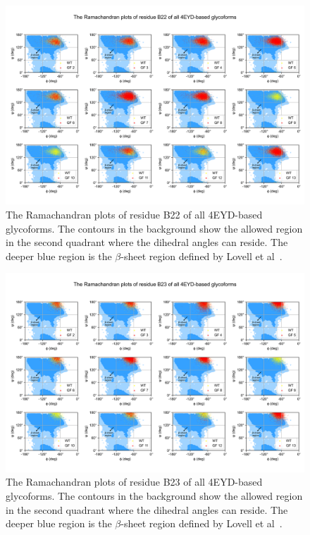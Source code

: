 \documentclass[sn-vancouver]{sn-jnl}
\begin{document}
\renewcommand{\thefigure}{S\arabic{figure}}
\begin{figure}[H]
\centering
\includegraphics[width=\textwidth]{Figures/4EYD_multi_rama_plot_res_43.png}
\caption{The Ramachandran plots of residue B22 of all 4EYD-based glycoforms. The contours in the background show the allowed region in the second quadrant where the dihedral angles can reside. The deeper blue region is the $\beta$-sheet region defined by Lovell et al~\cite{lovell2003structure}.}
\end{figure}

\renewcommand{\thefigure}{S\arabic{figure}}
\begin{figure}[H]
\centering
\includegraphics[width=\textwidth]{Figures/4EYD_multi_rama_plot_res_44.png}
\caption{The Ramachandran plots of residue B23 of all 4EYD-based glycoforms. The contours in the background show the allowed region in the second quadrant where the dihedral angles can reside. The deeper blue region is the $\beta$-sheet region defined by Lovell et al~\cite{lovell2003structure}.}
\end{figure}
\end{document}
